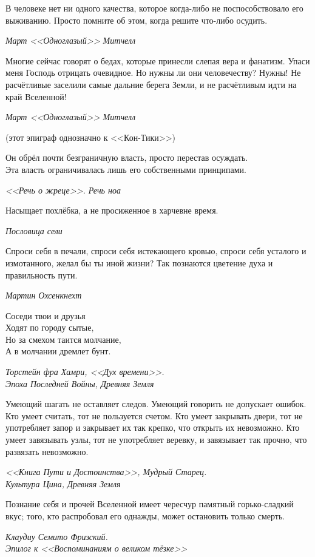 \documentclass[a4paper,10pt]{book}
\begin{document}
\epigraph{В человеке нет ни одного качества, которое
когда-либо не поспособствовало его выживанию. Просто помните об этом,
когда решите что-либо осудить.}
{\textit{Март <<Одноглазый>> Митчелл}}

\epigraph{Многие сейчас говорят о бедах, которые принесли слепая вера и 
фанатизм. 
Упаси меня Господь отрицать очевидное. Но нужны ли они человечеству?
Нужны! Не расчётливые заселили самые дальние берега Земли, 
и не расчётливым идти на край Вселенной!}
{\textit{Март <<Одноглазый>> Митчелл}}

(этот эпиграф однозначно к <<Кон-Тики>>)


\epigraph{Он обрёл почти безграничную власть, просто перестав осуждать.\\
Эта власть ограничивалась лишь его собственными принципами.}
{\textit{<<Речь о жреце>>. Речь ноа}}

\epigraph{Насыщает похлёбка, а не просиженное в харчевне время.}
{\textit{Пословица сели}}

\epigraph{Спроси себя в печали, спроси себя истекающего кровью, спроси себя 
усталого и измотанного, 
желал бы ты иной жизни? Так познаются цветение духа и правильность пути.}
{\textit{Мартин Охсенкнехт}}

\epigraph{Соседи твои и друзья\\Ходят по городу сытые,\\Но за смехом таится 
молчание,\\А в молчании дремлет бунт.}
{\textit{Торстейн фра Хамри, <<Дух времени>>.\\Эпоха Последней Войны, Древняя 
Земля}}

\epigraph{Умеющий шагать не оставляет следов.
Умеющий говорить не допускает ошибок.
Кто умеет считать, тот не пользуется счетом.
Кто умеет закрывать двери, тот не употребляет запор и закрывает их так крепко, 
что открыть их невозможно.
Кто умеет завязывать узлы, тот не употребляет веревку, и завязывает так прочно, 
что развязать невозможно.}
{\textit{<<Книга Пути и Достоинства>>, Мудрый Старец.\\Культура 
Цина, Древняя Земля}}

\epigraph{Познание себя и прочей Вселенной имеет чересчур памятный 
горько-сладкий вкус; того, кто распробовал его однажды, может остановить только 
смерть.}
{\textit{Клаудиу Семито Фризский.\\Эпилог к <<Воспоминаниям о великом тёзке>>}}
\end{document}
